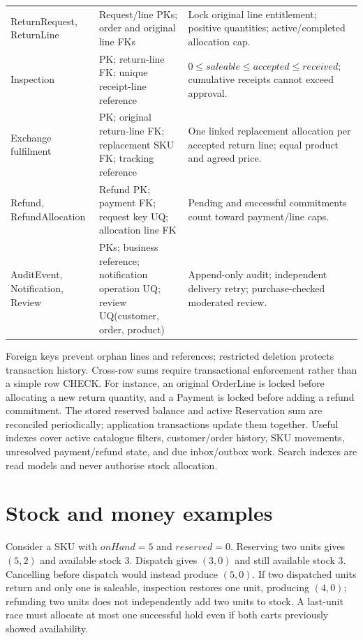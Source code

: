 \begin{longtable}{P{.2\linewidth}P{.35\linewidth}P{.34\linewidth}}
ReturnRequest, ReturnLine & Request/line PKs; order and original line FKs & Lock original line entitlement; positive quantities; active/completed allocation cap.\\
Inspection & PK; return-line FK; unique receipt-line reference & $0\leq saleable\leq accepted\leq received$; cumulative receipts cannot exceed approval.\\
Exchange fulfilment & PK; original return-line FK; replacement SKU FK; tracking reference & One linked replacement allocation per accepted return line; equal product and agreed price.\\
Refund, RefundAllocation & Refund PK; payment FK; request key UQ; allocation line FK & Pending and successful commitments count toward payment/line caps.\\
AuditEvent, Notification, Review & PKs; business reference; notification operation UQ; review UQ(customer, order, product) & Append-only audit; independent delivery retry; purchase-checked moderated review.\\
\bottomrule
\end{longtable}

Foreign keys prevent orphan lines and references; restricted deletion protects transaction history. Cross-row sums require transactional enforcement rather than a simple row CHECK. For instance, an original OrderLine is locked before allocating a new return quantity, and a Payment is locked before adding a refund commitment. The stored reserved balance and active Reservation sum are reconciled periodically; application transactions update them together. Useful indexes cover active catalogue filters, customer/order history, SKU movements, unresolved payment/refund state, and due inbox/outbox work. Search indexes are read models and never authorise stock allocation.

\section{Stock and money examples}
Consider a SKU with $onHand=5$ and $reserved=0$. Reserving two units gives $(5,2)$ and available stock 3. Dispatch gives $(3,0)$ and still available stock 3. Cancelling before dispatch would instead produce $(5,0)$. If two dispatched units return and only one is saleable, inspection restores one unit, producing $(4,0)$; refunding two units does not independently add two units to stock. A last-unit race must allocate at most one successful hold even if both carts previously showed availability.

